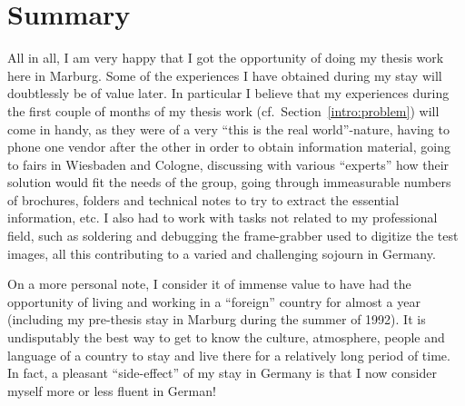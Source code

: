 
\section{Summary}
\label{concl:summary}

All in all, I am very happy that I got the opportunity of doing my
thesis work here in Marburg.  Some of the experiences I have obtained
during my stay will doubtlessly be of value later.  In particular I
believe that my experiences during the first couple of months of my
thesis work (cf.\ Section~\ref{intro:problem}) will come in handy, as
they were of a very ``this is the real world''-nature, having to phone
one vendor after the other in order to obtain information material,
going to fairs in Wiesbaden and Cologne, discussing with various
``experts'' how their solution would fit the needs of the group, going
through immeasurable numbers of brochures, folders and technical notes
to try to extract the essential information, etc.  I also had to work
with tasks not related to my professional field, such as soldering and
debugging the frame-grabber used to digitize the test images, all this
contributing to a varied and challenging sojourn in Germany.

On a more personal note, I consider it of immense value to have had
the opportunity of living and working in a ``foreign'' country for
almost a year (including my pre-thesis stay in Marburg during the
summer of 1992).  It is undisputably the best way to get to know the
culture, atmosphere, people and language of a country to stay and live
there for a relatively long period of time.  In fact, a pleasant
``side-effect'' of my stay in Germany is that I now consider myself
more or less fluent in German!
